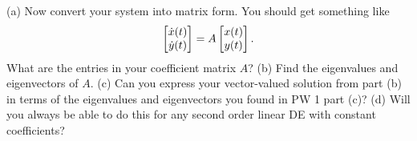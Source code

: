 \documentclass[epsf]{article}
\begin{document}
\noi (a) Now convert your system into matrix form.  You should get something like
$$ \begin{bmatrix}\dot{x}(t) \cr \dot{y}(t) \end{bmatrix} = A  \begin{bmatrix}x(t) \cr y(t) \end{bmatrix}.$$ What are the entries in your coefficient matrix $A$?
\vskip 2mm
\noi (b) Find the eigenvalues and eigenvectors of $A$.
\vskip 2mm
 \noi (c) Can you express your vector-valued solution from part (b) in terms of the eigenvalues and eigenvectors you found in PW 1 part (c)?  
\vskip 2mm
\noi (d) Will you always be able to do this for any second order linear DE with constant coefficients?
\end{document}
